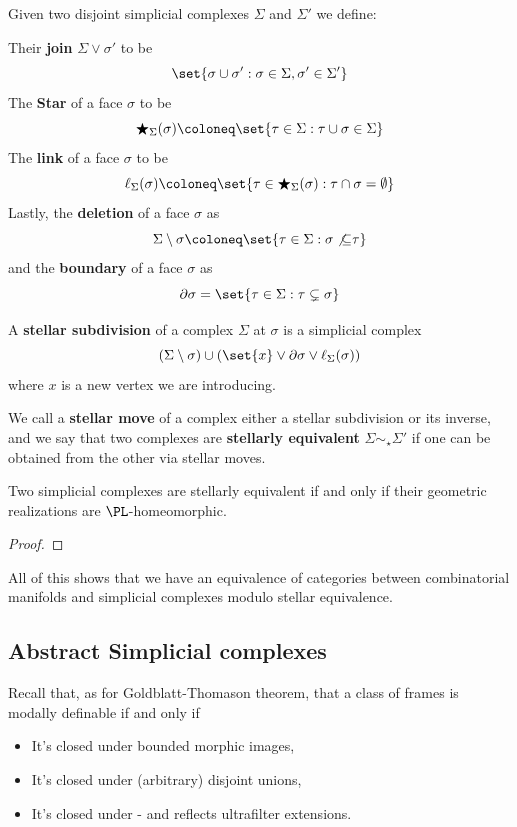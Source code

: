 \begin{definition}\hfill 

Given two disjoint simplicial complexes $\Sigma$ and $\Sigma'$ we define:

\noindent Their \textbf{join} $\Sigma\vee\sigma'$ to be 
\[\set{\sigma\cup\sigma': \sigma\in\Sigma,\sigma'\in\Sigma'}\]
The \textbf{Star} of a face $\sigma$ to be 
\[\bigstar_\Sigma(\sigma)\coloneq\set{\tau\in\Sigma:\tau\cup\sigma\in\Sigma}\]
The \textbf{link} of a face $\sigma$ to be 
\[\ell_\Sigma(\sigma)\coloneq \set{\tau\in\bigstar_\Sigma(\sigma): \tau\cap\sigma=\emptyset}\]
Lastly, the \textbf{deletion} of a face $\sigma$ as 
\[\Sigma\setminus\sigma\coloneq \set{\tau\in\Sigma: \sigma\not{\subseteq}\tau}\]
and the \textbf{boundary} of a face $\sigma$ as 
\[\partial\sigma=\set{\tau\in \Sigma: \tau\subsetneq \sigma}\]

\noindent A \textbf{stellar subdivision} of a complex $\Sigma$ at $\sigma$ is a simplicial complex 
\[(\Sigma\setminus\sigma) \cup (\set{x}\vee\partial \sigma\vee \ell_\Sigma(\sigma))\]
where $x$ is a new vertex we are introducing.

We call a \textbf{stellar move} of a complex either a stellar subdivision or its inverse, and we say that 
two complexes are \textbf{stellarly equivalent} $\Sigma\sim_\star\Sigma'$ if one can be obtained from the other via stellar moves.
\end{definition}

\begin{theorem}[Alexander]\hfill 

Two simplicial complexes are stellarly equivalent if and only if their geometric realizations are $\PL$-homeomorphic.    
\end{theorem}
\begin{proof}
\end{proof}

All of this shows that we have an equivalence of categories between combinatorial manifolds and simplicial complexes modulo stellar equivalence.

\subsection{Abstract Simplicial complexes}
Recall that, as for Goldblatt-Thomason theorem, that a class of frames is modally definable if and only if 
\begin{itemize}
    \item It's closed under bounded morphic images,
    \item It's closed under (arbitrary) disjoint unions,
    \item It's closed under - and reflects ultrafilter extensions.
\end{itemize}

